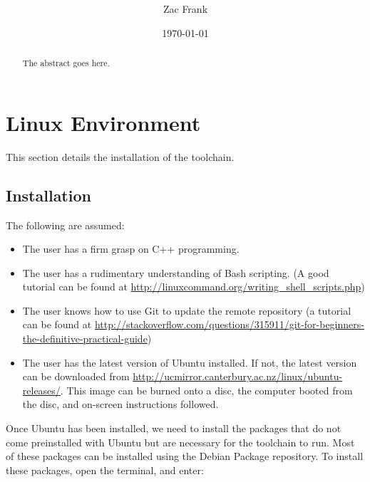 \documentclass[a4paper, oneside, 11pt, titlepage, onecolumn, openright]{report}
\title{\projecttitle \\ \documenttitle}
\author{Zac Frank}
\date{\today}
\begin{document}
	\maketitle
	
	\begin{abstract}

		The abstract goes here.

	\end{abstract}

	\clearpage
	\tableofcontents

	


	\clearpage

\chapter{Linux Environment}
		\label{C:Environment}

		This section details the installation of the toolchain.
		\section{Installation }
			\label{s:Installation}
			The following are assumed:
			
\begin{itemize}
			\label{Requirements}
\item The user has a firm grasp on C++ programming.

\item The user has a rudimentary understanding of Bash scripting. (A good tutorial can be found at \url{http://linuxcommand.org/writing\_shell\_scripts.php})

\item The user knows how to use Git to update the remote repository (a tutorial can be found at \url{http://stackoverflow.com/questions/315911/git-for-beginners-the-definitive-practical-guide})

\item The user has the latest version of Ubuntu installed. If not, the latest version can be downloaded from \url{http://ucmirror.canterbury.ac.nz/linux/ubuntu-releases/}. This image can be burned onto a disc, the computer booted from the disc, and on-screen instructions followed.

\end{itemize}
			Once Ubuntu has been installed, we need to install the packages that do not come preinstalled with Ubuntu but are necessary for the toolchain to run. Most of these packages can be installed using the Debian Package repository. To install these packages, open the terminal, and enter:
			
\end{document}
